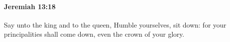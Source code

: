 
		\paragraph{Jeremiah 13:18} %
			\label{JEREMIAH-13-18}

			Say unto the king and to the queen, Humble yourselves, sit down: for your principalities shall come down, even the crown of your glory.


